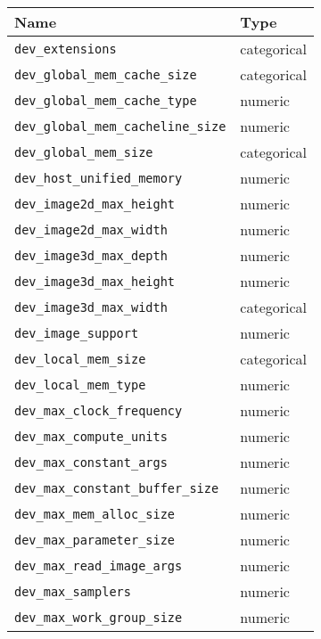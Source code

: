 \begin{tabular}{ll}
\toprule
                                           Name &         Type \\
\midrule
                       \texttt{dev\_extensions} &  categorical \\
         \texttt{dev\_global\_mem\_cache\_size} &  categorical \\
         \texttt{dev\_global\_mem\_cache\_type} &      numeric \\
     \texttt{dev\_global\_mem\_cacheline\_size} &      numeric \\
                \texttt{dev\_global\_mem\_size} &  categorical \\
            \texttt{dev\_host\_unified\_memory} &      numeric \\
             \texttt{dev\_image2d\_max\_height} &      numeric \\
              \texttt{dev\_image2d\_max\_width} &      numeric \\
              \texttt{dev\_image3d\_max\_depth} &      numeric \\
             \texttt{dev\_image3d\_max\_height} &      numeric \\
              \texttt{dev\_image3d\_max\_width} &  categorical \\
                   \texttt{dev\_image\_support} &      numeric \\
                 \texttt{dev\_local\_mem\_size} &  categorical \\
                 \texttt{dev\_local\_mem\_type} &      numeric \\
            \texttt{dev\_max\_clock\_frequency} &      numeric \\
              \texttt{dev\_max\_compute\_units} &      numeric \\
              \texttt{dev\_max\_constant\_args} &      numeric \\
      \texttt{dev\_max\_constant\_buffer\_size} &      numeric \\
            \texttt{dev\_max\_mem\_alloc\_size} &      numeric \\
             \texttt{dev\_max\_parameter\_size} &      numeric \\
           \texttt{dev\_max\_read\_image\_args} &      numeric \\
                    \texttt{dev\_max\_samplers} &      numeric \\
           \texttt{dev\_max\_work\_group\_size} &      numeric \\

\end{tabular}
